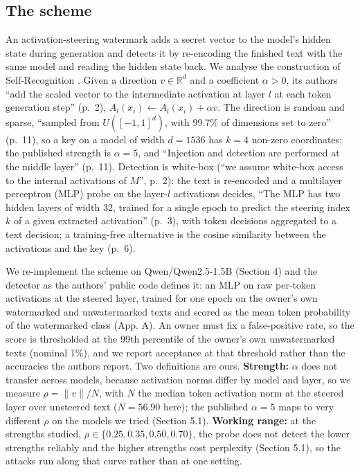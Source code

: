 \documentclass[11pt,letterpaper]{article}
\begin{document}
\hypertarget{the-scheme}{%
\subsection{The scheme}\label{the-scheme}}

An activation-steering watermark adds a secret vector to the model's hidden state during generation and detects it by re-encoding the finished text with the same model and reading the hidden state back. We analyse the construction of Self-Recognition \citep{ardoin2026selfrecognition}. Given a direction \(v \in \mathbb{R}^d\) and a coefficient \(\alpha > 0\), its authors ``add the scaled vector to the intermediate activation at layer \(l\) at each token generation step'' (p.~2), \(A_l(x_i) \leftarrow A_l(x_i) + \alpha v\). The direction is random and sparse, ``sampled from \(U([-1, 1]^d)\), with 99.7\% of dimensions set to zero'' (p.~11), so a key on a model of width \(d = 1536\) has \(k = 4\) non-zero coordinates; the published strength is \(\alpha = 5\), and ``Injection and detection are performed at the middle layer'' (p.~11). Detection is white-box (``we assume white-box access to the internal activations of \(M\)'', p.~2): the text is re-encoded and a multilayer perceptron (MLP) probe on the layer-\(l\) activations decides, ``The MLP has two hidden layers of width 32, trained for a single epoch to predict the steering index \(k\) of a given extracted activation'' (p.~3), with token decisions aggregated to a text decision; a training-free alternative is the cosine similarity between the activations and the key (p.~6).

We re-implement the scheme on Qwen/Qwen2.5-1.5B (Section 4) and the detector as the authors' public code defines it: an MLP on raw per-token activations at the steered layer, trained for one epoch on the owner's own watermarked and unwatermarked texts and scored as the mean token probability of the watermarked class (App. A). An owner must fix a false-positive rate, so the score is thresholded at the 99th percentile of the owner's own unwatermarked texts (nominal 1\%), and we report acceptance at that threshold rather than the accuracies the authors report. Two definitions are ours. \textbf{Strength:} \(\alpha\) does not transfer across models, because activation norms differ by model and layer, so we measure \(\rho = \lVert v \rVert / N\), with \(N\) the median token activation norm at the steered layer over unsteered text (\(N = 56.90\) here); the published \(\alpha = 5\) maps to very different \(\rho\) on the models we tried (Section 5.1). \textbf{Working range:} at the strengths studied, \(\rho \in \{0.25, 0.35, 0.50, 0.70\}\), the probe does not detect the lower strengths reliably and the higher strengths cost perplexity (Section 5.1), so the attacks run along that curve rather than at one setting.
\end{document}
